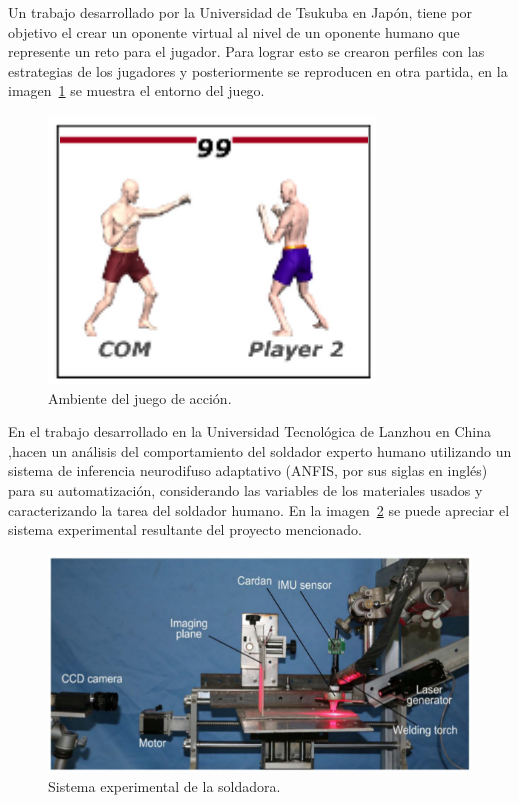Un trabajo desarrollado por la Universidad de Tsukuba en
 Japón\cite{Nakano2006}, tiene por objetivo el crear un oponente virtual
 al nivel de un oponente humano que represente un reto para el jugador. Para
 lograr esto se crearon perfiles con las estrategias de los jugadores y
 posteriormente se reproducen en otra partida, en la imagen~\ref{fig:imitat}
 se muestra el entorno del juego.


\begin{figure}[H]
\centering
\includegraphics[width=0.5\columnwidth]{CapituloI/Imagenes/Imitating.png}
\caption{Ambiente del juego de acción.}
\label{fig:imitat}
\end{figure}


En el trabajo desarrollado en la Universidad Tecnológica de Lanzhou en China
 \cite{Zhang2017},hacen un análisis del comportamiento del soldador experto
 humano utilizando un sistema de inferencia neurodifuso adaptativo (ANFIS,
 por sus siglas en inglés) para su automatización, considerando las variables
 de los materiales usados y caracterizando la tarea del soldador humano.
 En la imagen~\ref{fig:syswelding} se puede apreciar el sistema experimental
  resultante del proyecto mencionado.


\begin{figure}[H]
\centering
\includegraphics[width=0.8\columnwidth]{CapituloI/Imagenes/Welding.png}
\caption{Sistema experimental de la soldadora.}
\label{fig:syswelding}
\end{figure} 
 

